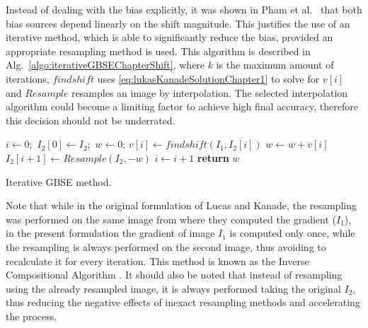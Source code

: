 Instead of dealing with the bias explicitly, it was shown in Pham et al.~\cite{pham2005performance} that both bias sources depend linearly on the shift magnitude. This justifies the use of an iterative method, which is able to significantly reduce the bias, provided an appropriate resampling method is used. This algorithm is described in Alg.~\ref{algo:iterativeGBSEChapterShift}, where $k$ is the maximum amount of iterations, $findshift$ uses \eqref{eq:lukasKanadeSolutionChapter1} to solve for $v[i]$ and $Resample$ resamples an image by interpolation. The selected interpolation algorithm could become a limiting factor to achieve high final accuracy, therefore this decision should not be underrated. 

\begin{algorithm}[htpb]
\begin{algorithmic}[1]
\State $i\gets  0$;\, $I_2[0] \gets I_2$;\, $w \gets 0$; %
\State $v[i] \gets {findshift}(I_1,I_2[i])$  
\State $w \gets w + v[i]$  
\State $I_2[i+1] \gets {Resample}(I_2, -w)$  
\State $i \gets i+1$
\EndWhile\label{euclidendwhile}
\State \textbf{return} $w$ 
\EndProcedure
\end{algorithmic}
 \caption{Iterative GBSE method.}\label{algo:iterativeGBSEChapterShift}
\end{algorithm}




Note that while in the original formulation of Lucas and Kanade, the resampling was performed on the same image from where they computed the gradient ($I_1$), in the present formulation the gradient of image $I_1$ is computed only once, while the resampling is always performed on the second image, thus avoiding to recalculate it for every iteration. This method is known as the Inverse Compositional Algorithm \cite{baker2004lucas}. It should also be noted that instead of resampling using the already resampled image, it is always performed taking the original $I_2$, thus reducing the negative effects of inexact resampling methods and accelerating the process.

